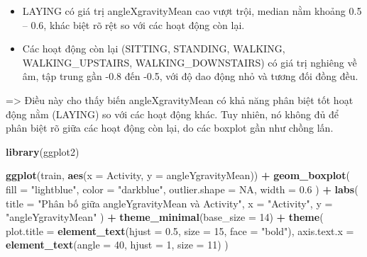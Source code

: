\documentclass[
]{article}
\newenvironment{Shaded}{\begin{snugshade}}{\end{snugshade}}
\newcommand{\AttributeTok}[1]{\textcolor[rgb]{0.13,0.29,0.53}{#1}}
\newcommand{\ConstantTok}[1]{\textcolor[rgb]{0.56,0.35,0.01}{#1}}
\newcommand{\DecValTok}[1]{\textcolor[rgb]{0.00,0.00,0.81}{#1}}
\newcommand{\FloatTok}[1]{\textcolor[rgb]{0.00,0.00,0.81}{#1}}
\newcommand{\FunctionTok}[1]{\textcolor[rgb]{0.13,0.29,0.53}{\textbf{#1}}}
\newcommand{\NormalTok}[1]{#1}
\newcommand{\SpecialCharTok}[1]{\textcolor[rgb]{0.81,0.36,0.00}{\textbf{#1}}}
\newcommand{\StringTok}[1]{\textcolor[rgb]{0.31,0.60,0.02}{#1}}
\begin{document}
\begin{itemize}
\item
  LAYING có giá trị angleXgravityMean cao vượt trội, median nằm khoảng
  0.5 -- 0.6, khác biệt rõ rệt so với các hoạt động còn lại.
\item
  Các hoạt động còn lại (SITTING, STANDING, WALKING, WALKING\_UPSTAIRS,
  WALKING\_DOWNSTAIRS) có giá trị nghiêng về âm, tập trung gần -0.8 đến
  -0.5, với độ dao động nhỏ và tương đối đồng đều.
\end{itemize}

=\textgreater{} Điều này cho thấy biến angleXgravityMean có khả năng
phân biệt tốt hoạt động nằm (LAYING) so với các hoạt động khác. Tuy
nhiên, nó không đủ để phân biệt rõ giữa các hoạt động còn lại, do các
boxplot gần như chồng lấn.

\begin{Shaded}
\begin{Highlighting}[]
\FunctionTok{library}\NormalTok{(ggplot2)}

\FunctionTok{ggplot}\NormalTok{(train, }\FunctionTok{aes}\NormalTok{(}\AttributeTok{x =}\NormalTok{ Activity, }\AttributeTok{y =}\NormalTok{ angleYgravityMean)) }\SpecialCharTok{+}
  \FunctionTok{geom\_boxplot}\NormalTok{(}
    \AttributeTok{fill =} \StringTok{"lightblue"}\NormalTok{,}
    \AttributeTok{color =} \StringTok{"darkblue"}\NormalTok{,}
    \AttributeTok{outlier.shape =} \ConstantTok{NA}\NormalTok{,}
    \AttributeTok{width =} \FloatTok{0.6}
\NormalTok{  ) }\SpecialCharTok{+}
  \FunctionTok{labs}\NormalTok{(}
    \AttributeTok{title =} \StringTok{"Phân bố giữa angleYgravityMean và Activity"}\NormalTok{,}
    \AttributeTok{x =} \StringTok{"Activity"}\NormalTok{,}
    \AttributeTok{y =} \StringTok{"angleYgravityMean"}
\NormalTok{  ) }\SpecialCharTok{+}
  \FunctionTok{theme\_minimal}\NormalTok{(}\AttributeTok{base\_size =} \DecValTok{14}\NormalTok{) }\SpecialCharTok{+}
  \FunctionTok{theme}\NormalTok{(}
    \AttributeTok{plot.title =} \FunctionTok{element\_text}\NormalTok{(}\AttributeTok{hjust =} \FloatTok{0.5}\NormalTok{, }\AttributeTok{size =} \DecValTok{15}\NormalTok{, }\AttributeTok{face =} \StringTok{"bold"}\NormalTok{),}
    \AttributeTok{axis.text.x =} \FunctionTok{element\_text}\NormalTok{(}\AttributeTok{angle =} \DecValTok{40}\NormalTok{, }\AttributeTok{hjust =} \DecValTok{1}\NormalTok{, }\AttributeTok{size =} \DecValTok{11}\NormalTok{)}
\NormalTok{  )}
\end{Highlighting}
\end{Shaded}
\end{document}
